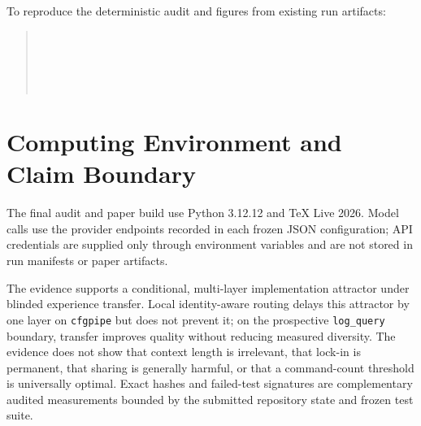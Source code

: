 \documentclass[letterpaper]{article}
\begin{document}
To reproduce the deterministic audit and figures from existing run artifacts:
\begin{quote}
\footnotesize
{}\\
\\
\\
\\
\end{quote}

\section{Computing Environment and Claim Boundary}

The final audit and paper build use Python 3.12.12 and TeX Live 2026. Model
calls use the provider endpoints recorded in each frozen JSON configuration;
API credentials are supplied only through environment variables and are not
stored in run manifests or paper artifacts.

The evidence supports a conditional, multi-layer implementation attractor under
blinded experience transfer. Local identity-aware routing delays this attractor
by one layer on \texttt{cfgpipe} but does not prevent it; on the prospective
\texttt{log\_query}
boundary, transfer improves quality without reducing measured diversity. The
evidence does not show that context length is irrelevant, that lock-in is
permanent, that sharing is generally harmful, or that a command-count threshold
is universally optimal. Exact hashes and failed-test signatures are complementary
audited measurements bounded by the submitted repository state and frozen test
suite.
\end{document}
